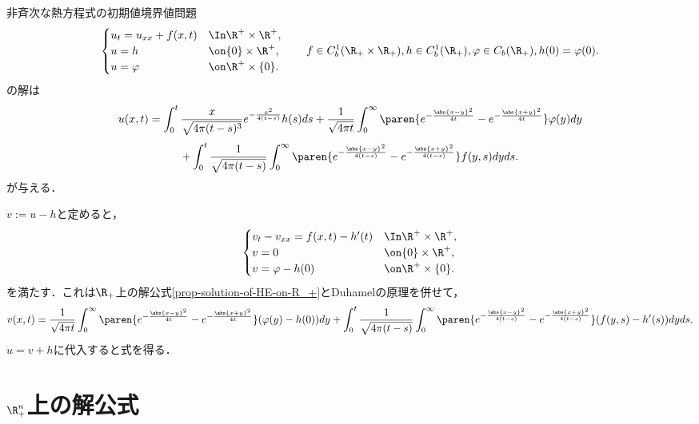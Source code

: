\documentclass[uplatex,dvipdfmx]{jsreport}
\begin{document}
\begin{problem}
    非斉次な熱方程式の初期値境界値問題
    \[\begin{cases}
        u_t=u_{xx}+f(x,t)&\In\R^+\times\R^+,\\
        u=h&\on\{0\}\times\R^+,\\
        u=\varphi&\on\R^+\times\{0\}.
    \end{cases}\qquad f\in C^1_b(\R_+\times\R_+),h\in C^1_b(\R_+),\varphi\in C_b(\R_+),h(0)=\varphi(0).\]
    の解は
    \[u(x,t)=\int^t_0\frac{x}{\sqrt{4\pi(t-s)^3}}e^{-\frac{x^2}{4(t-s)}}h(s)ds+\frac{1}{\sqrt{4\pi t}}\int^\infty_0\paren{e^{-\frac{\abs{x-y}^2}{4t}}-e^{-\frac{\abs{x+y}^2}{4t}}}\varphi(y)dy\]
    \[+\int^t_0\frac{1}{\sqrt{4\pi(t-s)}}\int^\infty_0\paren{e^{-\frac{\abs{x-y}^2}{4(t-s)}}-e^{-\frac{\abs{x+y}^2}{4(t-s)}}}f(y,s)dyds.\]
    が与える．
\end{problem}
\begin{Proof}[\underline{\bf【解】}]
    $v:=u-h$と定めると，
    \[\begin{cases}
        v_t-v_{xx}=f(x,t)-h'(t)&\In\R^+\times\R^+,\\
        v=0&\on\{0\}\times\R^+,\\
        v=\varphi-h(0)&\on\R^+\times\{0\}.
    \end{cases}\]
    を満たす．これは$\R_+$上の解公式\ref{prop-solution-of-HE-on-R_+}とDuhamelの原理を併せて，
    \[v(x,t)=\frac{1}{\sqrt{4\pi t}}\int^\infty_0\paren{e^{-\frac{\abs{x-y}^2}{4t}}-e^{-\frac{\abs{x+y}^2}{4t}}}(\varphi(y)-h(0))dy+\int^t_0\frac{1}{\sqrt{4\pi(t-s)}}\int^\infty_0\paren{e^{-\frac{\abs{x-y}^2}{4(t-s)}}-e^{-\frac{\abs{x+y}^2}{4(t-s)}}}(f(y,s)-h'(s))dyds.\]
    $u=v+h$に代入すると式を得る．
\end{Proof}

\section{$\R^n_+$上の解公式}
\end{document}
